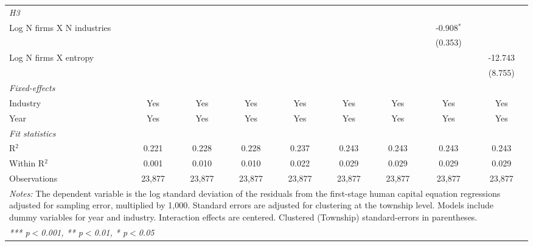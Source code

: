 \begin{tabular}{lcccccccc}
\emph{H3} \\ 
   Log N firms X N industries                            &             &                 &                 &                 &                 &                 & -0.908$^{*}$    &   \\   
                                                         &             &                 &                 &                 &                 &                 & (0.353)         &   \\   
   Log N firms X entropy                                 &             &                 &                 &                 &                 &                 &                 & -12.743\\   
                                                         &             &                 &                 &                 &                 &                 &                 & (8.755)\\   
   \midrule
   \emph{Fixed-effects}\\
   Industry                                              & Yes         & Yes             & Yes             & Yes             & Yes             & Yes             & Yes             & Yes\\  
   Year                                                  & Yes         & Yes             & Yes             & Yes             & Yes             & Yes             & Yes             & Yes\\  
   \midrule
   \emph{Fit statistics}\\
   R$^2$                                                 & 0.221       & 0.228           & 0.228           & 0.237           & 0.243           & 0.243           & 0.243           & 0.243\\  
   Within R$^2$                                          & 0.001       & 0.010           & 0.010           & 0.022           & 0.029           & 0.029           & 0.029           & 0.029\\  
   Observations                                          & 23,877      & 23,877          & 23,877          & 23,877          & 23,877          & 23,877          & 23,877          & 23,877\\  
   \midrule \midrule
\multicolumn{9}{p{24cm}}{\emph{Notes:} The dependent variable is the log 
    standard deviation of the residuals from the first-stage human capital equation 
    regressions adjusted for sampling error, multiplied by 1,000. Standard errors 
    are adjusted for clustering at the township level. Models include dummy variables 
    for year and industry. Interaction effects are centered. Clustered (Township) 
    standard-errors in parentheses.}\\
\multicolumn{9}{l}{\emph{*** p$<$0.001, ** p$<$0.01, * p$<$0.05}} \\ 
\end{tabular}
\par\endgroup

